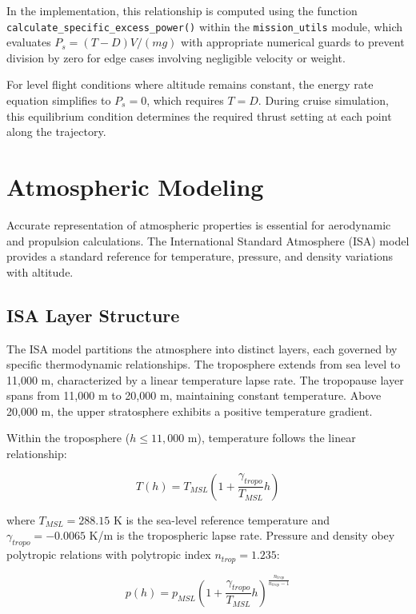 In the implementation, this relationship is computed using the function \texttt{calculate\_specific\_excess\_power()} within the \texttt{mission\_utils} module, which evaluates $P_s = (T-D)V/(mg)$ with appropriate numerical guards to prevent division by zero for edge cases involving negligible velocity or weight.

For level flight conditions where altitude remains constant, the energy rate equation simplifies to $P_s = 0$, which requires $T = D$. During cruise simulation, this equilibrium condition determines the required thrust setting at each point along the trajectory.

\section{Atmospheric Modeling}

Accurate representation of atmospheric properties is essential for aerodynamic and propulsion calculations. The International Standard Atmosphere (ISA) model provides a standard reference for temperature, pressure, and density variations with altitude.

\subsection{ISA Layer Structure}

The ISA model partitions the atmosphere into distinct layers, each governed by specific thermodynamic relationships. The troposphere extends from sea level to 11,000 m, characterized by a linear temperature lapse rate. The tropopause layer spans from 11,000 m to 20,000 m, maintaining constant temperature. Above 20,000 m, the upper stratosphere exhibits a positive temperature gradient.

Within the troposphere ($h \leq 11,000$ m), temperature follows the linear relationship:

\begin{equation}
T(h) = T_{MSL}\left(1 + \frac{\gamma_{tropo}}{T_{MSL}}h\right)
\end{equation}

where $T_{MSL} = 288.15$ K is the sea-level reference temperature and $\gamma_{tropo} = -0.0065$ K/m is the tropospheric lapse rate. Pressure and density obey polytropic relations with polytropic index $n_{trop} = 1.235$:

\begin{equation}
p(h) = p_{MSL}\left(1 + \frac{\gamma_{tropo}}{T_{MSL}}h\right)^{\frac{n_{trop}}{n_{trop}-1}}
\end{equation}

